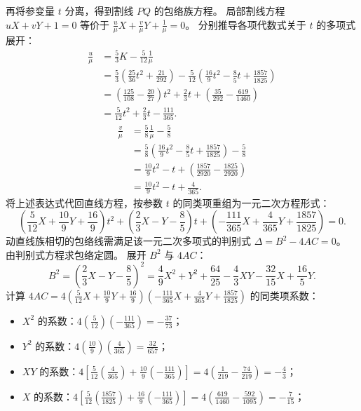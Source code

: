 \begin{solution}
再将参变量 $t$ 分离，得到割线 $PQ$ 的包络族方程。
局部割线方程 $uX + vY + 1 = 0$ 等价于 $\frac{u}{\mu}X + \frac{v}{\mu}Y + \frac{1}{\mu} = 0$。
分别推导各项代数式关于 $t$ 的多项式展开：
\begin{align*}
\frac{u}{\mu} &= \frac{5}{3}K - \frac{5}{12}\frac{1}{\mu} \\
&= \frac{5}{3}\left(\frac{25}{36}t^2 + \frac{21}{292}\right) - \frac{5}{12}\left(\frac{16}{9}t^2 - \frac{8}{5}t + \frac{1857}{1825}\right) \\
&= \left(\frac{125}{108} - \frac{20}{27}\right)t^2 + \frac{2}{3}t + \left(\frac{35}{292} - \frac{619}{1460}\right) \\
&= \frac{5}{12}t^2 + \frac{2}{3}t - \frac{111}{365}.
\end{align*}
\begin{align*}
\frac{v}{\mu} &= \frac{5}{8}\frac{1}{\mu} - \frac{5}{8} \\
&= \frac{5}{8}\left(\frac{16}{9}t^2 - \frac{8}{5}t + \frac{1857}{1825}\right) - \frac{5}{8} \\
&= \frac{10}{9}t^2 - t + \left(\frac{1857}{2920} - \frac{1825}{2920}\right) \\
&= \frac{10}{9}t^2 - t + \frac{4}{365}.
\end{align*}
将上述表达式代回直线方程，按参数 $t$ 的同类项重组为一元二次方程形式：
\[ \left(\frac{5}{12}X + \frac{10}{9}Y + \frac{16}{9}\right)t^2 + \left(\frac{2}{3}X - Y - \frac{8}{5}\right)t + \left(-\frac{111}{365}X + \frac{4}{365}Y + \frac{1857}{1825}\right) = 0. \]
动直线族相切的包络线需满足该一元二次多项式的判别式 $\Delta = B^2 - 4AC = 0$。\\
由判别式方程求包络定圆。
展开 $B^2$ 与 $4AC$：
\[ B^2 = \left(\frac{2}{3}X - Y - \frac{8}{5}\right)^2 = \frac{4}{9}X^2 + Y^2 + \frac{64}{25} - \frac{4}{3}XY - \frac{32}{15}X + \frac{16}{5}Y. \]
计算 $4AC = 4\left(\frac{5}{12}X + \frac{10}{9}Y + \frac{16}{9}\right)\left(-\frac{111}{365}X + \frac{4}{365}Y + \frac{1857}{1825}\right)$ 的同类项系数：
\begin{itemize}
\item $X^2$ 的系数：$4\left(\frac{5}{12}\right)\left(-\frac{111}{365}\right) = -\frac{37}{73}$；
\item $Y^2$ 的系数：$4\left(\frac{10}{9}\right)\left(\frac{4}{365}\right) = \frac{32}{657}$；
\item $XY$ 的系数：$4\left[ \frac{5}{12}\left(\frac{4}{365}\right) + \frac{10}{9}\left(-\frac{111}{365}\right) \right] = 4\left(\frac{1}{219} - \frac{74}{219}\right) = -\frac{4}{3}$；
\item $X$ 的系数：$4\left[ \frac{5}{12}\left(\frac{1857}{1825}\right) + \frac{16}{9}\left(-\frac{111}{365}\right) \right] = 4\left(\frac{619}{1460} - \frac{592}{1095}\right) = -\frac{7}{15}$；

\end{itemize}
\end{solution}
